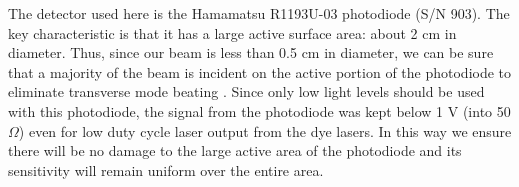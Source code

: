 The detector used here is the Hamamatsu R1193U-03 photodiode (S/N 903). The key characteristic is that it has a large active surface area: about 2 cm in diameter. Thus, since our beam is less than 0.5 cm in diameter, we can be sure that a majority of the beam is incident on the active portion of the photodiode to eliminate transverse mode beating \cite{Siegman:1986a}. Since only low light levels should be used with this photodiode, the signal from the photodiode was kept below 1 V (into 50 $\Omega$) even for low duty cycle laser output from the dye lasers. In this way we ensure there will be no damage to the large active area of the photodiode and its sensitivity will remain uniform over the entire area.

